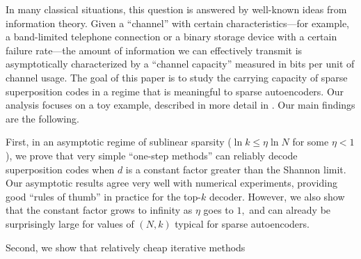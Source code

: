 In many classical situations, this question is answered by well-known ideas from information theory. Given a ``channel'' with certain characteristics---for example, a band-limited telephone connection or a binary storage device with a certain failure rate---the amount of information we can effectively transmit is asymptotically characterized by a ``channel capacity'' measured in bits per unit of channel usage. The goal of this paper is to study the carrying capacity of sparse superposition codes in a regime that is meaningful to sparse autoencoders. Our analysis focuses on a toy example, described in more detail in . Our main findings are the following.

First, in an asymptotic regime of sublinear sparsity ($\ln k \le \eta \ln N$ for some $\eta < 1$), we prove that very simple ``one-step methods'' can reliably decode superposition codes when $d$ is a constant factor greater than the Shannon limit. Our asymptotic results agree very well with numerical experiments, providing good ``rules of thumb'' in practice for the top-$k$ decoder. However, we also show that the constant factor grows to infinity as $\eta$ goes to $1,$ and can already be surprisingly large for values of $(N, k)$ typical for sparse autoencoders.

Second, we show that relatively cheap iterative methods

